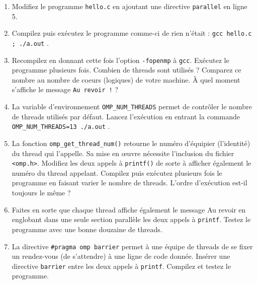 \documentclass[A4wide]{article}
\begin{document}
\begin{enumerate}
\item Modifiez le programme \verb#hello.c# en ajoutant une
  directive \verb&parallel& en ligne 5.

\item Compilez puis exécutez le programme comme-ci de rien n'était :
  \verb#gcc hello.c ; ./a.out# .

\item Recompilez en donnant cette fois l'option \verb#-fopenmp# à
  \verb&gcc&.  Exécutez le programme plusieurs fois. Combien de
  threads sont utilisés ? Comparez ce nombre au nombre de coeurs
  (logiques) de votre machine. À quel moment s'affiche le message \og
  \verb#Au revoir !#\fg{} ?

\item La variable d'environnement \verb#OMP_NUM_THREADS# permet de
  contrôler le nombre de threads utilisés par défaut. Lancez l'exécution
  en entrant la commande \verb#OMP_NUM_THREADS=13 ./a.out# .

\item La fonction \verb#omp_get_thread_num()# retourne le numéro
  d'équipier (l'identité) du thread qui l'appelle. Sa mise en œuvre
  nécessite l'inclusion du fichier \verb#<omp.h>#. Modifiez les deux
  appels à \verb#printf()# de sorte à afficher également le numéro du
  thread appelant. Compilez puis exécutez plusieurs fois le programme
  en faisant varier le nombre de threads.  L'ordre d'exécution est-il
  toujours le même ?

\item Faites en sorte que chaque thread affiche également le message
  \og Au revoir\fg{} en englobant dans une seule section parallèle les deux appels à
  \verb&printf&. Testez le programme avec une bonne douzaine de threads. 



\item La directive \verb&#pragma omp barrier& permet à une équipe de
  threads de se fixer un rendez-vous (de s'attendre)  à une ligne
  de code donnée. Insérer une directive \verb#barrier# entre les deux appels
  à \verb#printf#. Compilez et testez le programme.

\end{enumerate}
\end{document}
